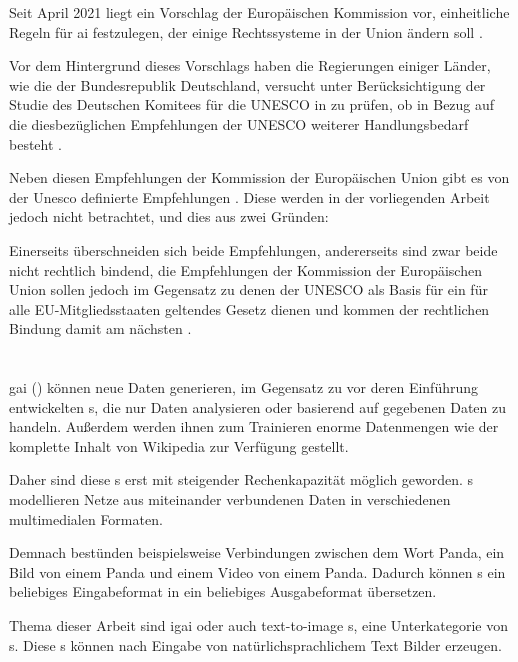 \documentclass[hidelinks,12pt]{report}
\begin{document}
Seit April 2021 liegt ein Vorschlag der Europäischen Kommission vor, einheitliche Regeln für \gls{ai} festzulegen, der einige Rechtssysteme in der Union ändern soll \cite{GesetzesentwurfEUComm}.

Vor dem Hintergrund dieses Vorschlags haben die Regierungen einiger Länder, wie die der Bundesrepublik Deutschland, versucht unter Berücksichtigung der Studie des Deutschen Komitees für die UNESCO in \cite[UNESCO-Empfehlung zur Ethik Künstlicher Intelligenz. Bedingungen zur Implementierung in Deutschland]{Kettemann} zu prüfen, ob in Bezug auf die diesbezüglichen Empfehlungen der UNESCO weiterer Handlungsbedarf besteht \cite{Deutscher_Bundestag}.  

Neben diesen Empfehlungen der Kommission der Europäischen Union gibt es von der Unesco definierte Empfehlungen \cite{UNESCO}. Diese werden in der vorliegenden Arbeit jedoch nicht betrachtet, und dies aus zwei Gründen: 

Einerseits überschneiden sich beide Empfehlungen, andererseits sind zwar beide nicht rechtlich bindend, die Empfehlungen der Kommission der Europäischen Union sollen jedoch im Gegensatz zu denen der UNESCO als Basis für ein für alle EU-Mitgliedsstaaten geltendes Gesetz dienen und kommen der rechtlichen Bindung damit am nächsten \cite{european_approach}.


\section{}\label{def_ki}
\gls{gai} () können neue Daten generieren, im Gegensatz zu vor deren Einführung entwickelten s, die nur Daten analysieren oder basierend auf gegebenen Daten zu handeln. Außerdem werden ihnen zum Trainieren enorme Datenmengen wie der komplette Inhalt von Wikipedia zur Verfügung gestellt. 

Daher sind diese s erst mit steigender Rechenkapazität möglich geworden. s modellieren Netze aus miteinander verbundenen Daten in verschiedenen multimedialen Formaten. 

Demnach bestünden beispielsweise Verbindungen zwischen dem Wort Panda, ein Bild von einem Panda und einem Video von einem Panda. Dadurch können s ein beliebiges Eingabeformat in ein beliebiges Ausgabeformat übersetzen. 

Thema dieser Arbeit sind \gls{igai} oder auch text-to-image s, eine Unterkategorie von s. Diese s können nach Eingabe von natürlichsprachlichem Text Bilder erzeugen.
\cite{Roberto}\\
\end{document}

